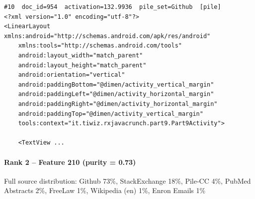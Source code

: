 \begin{verbatim}
#10  doc_id=954  activation=132.9936  pile_set=Github  [pile]
<?xml version="1.0" encoding="utf-8"?>
<LinearLayout xmlns:android="http://schemas.android.com/apk/res/android"
    xmlns:tools="http://schemas.android.com/tools"
    android:layout_width="match_parent"
    android:layout_height="match_parent"
    android:orientation="vertical"
    android:paddingBottom="@dimen/activity_vertical_margin"
    android:paddingLeft="@dimen/activity_horizontal_margin"
    android:paddingRight="@dimen/activity_horizontal_margin"
    android:paddingTop="@dimen/activity_vertical_margin"
    tools:context="it.tiwiz.rxjavacrunch.part9.Part9Activity">

    <TextView ...

\end{verbatim}

\paragraph*{Rank 2 -- Feature 210 (purity = 0.73)}

Full source distribution: Github 73\%, StackExchange 18\%, Pile-CC 4\%, PubMed Abstracts 2\%, FreeLaw 1\%, Wikipedia (en) 1\%, Enron Emails 1\%

